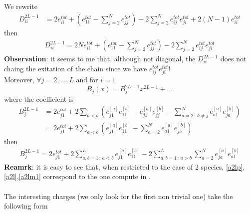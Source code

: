 \documentclass[11pt]{article}
\numberwithin{equation}{section}
\numberwithin{equation}{subsection}
\begin{document}
We rewrite
\begin{equation}
	\begin{split}
	D_{ii}^{2L-1}&=2e_{ii}^{tot}+\left(e_{11}^{tot}-\sum_{j=2}^{N}e_{jj}^{tot}\right)-2\sum_{j=2}^{N}e_{ij}^{tot}e_{ji}^{tot}+2(N-1)e_{ii}^{tot}
\end{split}
\end{equation}
then
\begin{equation}
\begin{split}
\boxed{D_{ii}^{2L-1}=	2Ne_{ii}^{tot}+\left(e_{11}^{tot}-\sum_{j=2}^{N}e_{jj}^{tot}\right)-2\sum_{j=2}^{N}e_{ij}^{tot}e_{ji}^{tot}}
	\end{split}
\end{equation}
\textbf{Observation}: it seems to me that, although not diagonal, the $D_{ii}^{2L-1}$ does not chaing the exitation of the chain since we have $e_{ij}^{tot}e_{ji}^{tot}$!\\
Moreover, $\forall j=2,\ldots,L$ and for $i=1$
\begin{equation}
	B_{j}(x)=B_{j}^{2L-1}x^{2L-1}+\ldots
\end{equation}
where the coefficient is 
\begin{equation}\label{b}
\begin{split}
	B_{j}^{2L-1}&=2e_{j1}^{tot}+2\sum_{a< b}\left(e_{j1}^{[a]}e_{11}^{[b]}-e_{j1}^{[a]}e_{jj}^{[b]}-\sum_{a=2\,:\,k\neq j}^{N}e_{a1}^{[a]}e_{ja}^{[b]}\right)\\
	&=2e_{j1}^{tot}+2\sum_{a< b}\left(e_{j1}^{[a]}e_{11}^{[b]}-\sum_{a=2}^{N}e_{a1}^{[a]}e_{ja}^{[b]}\right)
\end{split}
\end{equation}
then
\begin{equation}
\begin{split}
	\boxed{B_{j}^{2L-1}=2e_{j1}^{tot}+
	2\sum_{a,b=1\,:\, a<b}^{L}e_{j1}^{[a]}e_{11}^{[b]}-2\sum_{a,b=1\,:\, a>b}^{L}\sum_{a=2}^{N}e_{ja}^{[a]}e_{a1}^{[b]}}
\end{split}
\end{equation}
\textbf{Reamrk}: it is easy to see that, when restricted to the case of 2 species,  \eqref{a2lp},\eqref{a2l},\eqref{a2lm1} correspond to the one compute in \cite{frassek2020eigenstates}. \\ \\
The interesting charges (we only look for the first non trivial one) take the following form  
\end{document}
